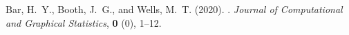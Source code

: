 \documentclass[a4paper,12pt]{article}
\begin{document}
% 
% 
% 
% 


\begin{thebibliography}{99}
{\rm Bar, H.~Y., Booth, J.~G., {\rm and} Wells, M.~T.} (2020).
.
\newblock \emph{Journal of Computational and Graphical Statistics}, {\bf  0} (0),  1--12.
\end{thebibliography}
\end{document}
